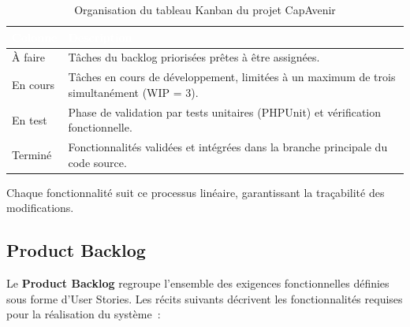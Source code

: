 \begin{table}[H]
\centering
\small
\renewcommand{\arraystretch}{1.5}
\begin{tabular}{|p{3cm}|p{11.5cm}|}
\hline
\rowcolor{headercolor}
\textcolor{white}{\textbf{Colonne}} & \textcolor{white}{\textbf{Description}} \\
\hline
À faire   & Tâches du backlog priorisées prêtes à être assignées. \\
\hline
\rowcolor{rowgray}
En cours  & Tâches en cours de développement, limitées à un maximum de trois simultanément (WIP = 3). \\
\hline
En test   & Phase de validation par tests unitaires (PHPUnit) et vérification fonctionnelle. \\
\hline
\rowcolor{rowgray}
Terminé   & Fonctionnalités validées et intégrées dans la branche principale du code source. \\
\hline
\end{tabular}
\caption{Organisation du tableau Kanban du projet CapAvenir}
\label{tab:kanban}
\end{table}

Chaque fonctionnalité suit ce processus linéaire, garantissant la traçabilité des modifications.

\subsection{Product Backlog}

Le \textbf{Product Backlog} regroupe l'ensemble des exigences fonctionnelles définies sous forme d'User Stories. Les récits suivants décrivent les fonctionnalités requises pour la réalisation du système~:

